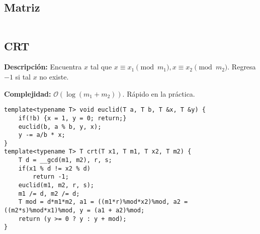 \documentclass[twocolumn]{article}
\begin{document}
\subsection{Matriz}
\lstset{basicstyle=\footnotesize\ttfamily,breaklines=true,tabsize=2,language=C++,frame=leftline, numbers=left, numberstyle=\tiny, numbersep=5pt}
\begin{lstlisting}

\end{lstlisting}
\subsection{CRT}
\begin{footnotesize}{\bf Descripción: } Encuentra $x$ tal que $x \equiv x_1 \pmod{m_1}, x \equiv x_2 \pmod{m_2}$. Regresa $-1$ si tal $x$ no existe.


{\bf Complejidad: } $\mathcal{O}(\log(m_1 + m_2))$. Rápido en la práctica.
\end{footnotesize}\lstset{basicstyle=\footnotesize\ttfamily,breaklines=true,tabsize=2,language=C++,frame=leftline, numbers=left, numberstyle=\tiny, numbersep=5pt}
\begin{lstlisting}
template<typename T> void euclid(T a, T b, T &x, T &y) {
	if(!b) {x = 1, y = 0; return;}
	euclid(b, a % b, y, x);
	y -= a/b * x;
}
template<typename T> T crt(T x1, T m1, T x2, T m2) {
	T d = __gcd(m1, m2), r, s;
	if(x1 % d != x2 % d)
		return -1;
	euclid(m1, m2, r, s);
	m1 /= d, m2 /= d;
	T mod = d*m1*m2, a1 = ((m1*r)%mod*x2)%mod, a2 = ((m2*s)%mod*x1)%mod, y = (a1 + a2)%mod;
	return (y >= 0 ? y : y + mod);
}
\end{lstlisting}
\end{document}
